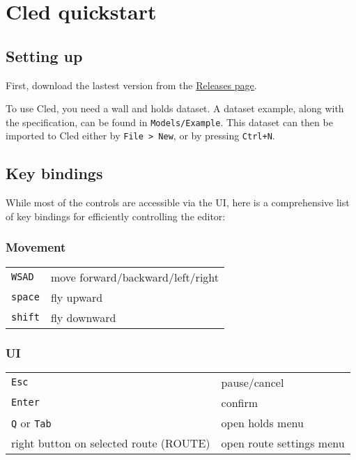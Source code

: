 \chapter{Cled quickstart}\label{apx:cled}

\section{Setting up}
First, download the lastest version from the \href{https://github.com/Climber-Tools/Cled/releases}{Releases page}.

To use Cled, you need a wall and holds dataset. A dataset example, along with the specification, can be found in \verb|Models/Example|.
This dataset can then be imported to Cled either by \verb|File > New|, or by pressing
\verb|Ctrl+N|.

\section{Key bindings}

While most of the controls are accessible via the UI, here is a comprehensive list of key bindings for efficiently controlling the editor:

\subsection{Movement}

\begin{tabular}[]{@{}ll@{}}
\toprule
\verb|WSAD| & move forward/backward/left/right \\
\verb|space| & fly upward \\
\verb|shift| & fly downward \\
\bottomrule
\end{tabular}

\subsection{UI}

\begin{tabular}[]{@{}ll@{}}
\toprule
\verb|Esc| & pause/cancel \\
\verb|Enter| & confirm \\
\verb|Q| or \verb|Tab| & open holds menu \\
right button on selected route (ROUTE) & open route settings menu \\
\bottomrule
\end{tabular}


